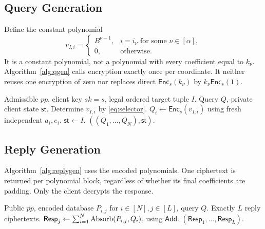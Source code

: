 \subsection{Query Generation}
\label{sec:qgen}
Define the constant polynomial
\begin{equation}
\label{eq:selector}
 v_{I,i}=\begin{cases}B^{\nu-1},&i=i_{\nu}\text{ for some }\nu\in[\alpha],\\
                         0,&\text{otherwise}.\end{cases}
\end{equation}
It is a constant polynomial, not a polynomial with every coefficient equal
to \(k_{\nu}\). Algorithm~\ref{alg:qgen} calls encryption exactly once per
coordinate. It neither reuses one encryption of zero nor replaces direct
\(\mathsf{Enc}_s(k_{\nu})\) by \(k_{\nu}\mathsf{Enc}_s(1)\).
\begin{algorithm}[t]
\caption{Query Generation \(\mathsf{QueryGen}(pp,sk,I)\)}
\label{alg:qgen}
\begin{algorithmic}[1]
\Require Admissible \(pp\), client key \(sk=s\), legal ordered target tuple \(I\).
\Ensure Query \(Q\), private client state \(\mathsf{st}\).
 \State Determine \(v_{I,i}\) by \eqref{eq:selector}.
 \State \(Q_i\leftarrow\mathsf{Enc}_s(v_{I,i})\) using fresh independent \(a_i,e_i\).
\EndFor
\State \(\mathsf{st}\gets I\).
\State \Return \(((Q_1,\ldots,Q_N),\mathsf{st})\).
\end{algorithmic}
\end{algorithm}

\subsection{Reply Generation}
\label{sec:reply}
Algorithm~\ref{alg:replygen} uses the encoded polynomials. One ciphertext is
returned per polynomial block, regardless of whether its final coefficients
are padding. Only the client decrypts the response.
\begin{algorithm}[t]
\caption{Reply Generation \(\mathsf{ReplyGen}(pp,\{P_{i,j}\},Q)\)}
\label{alg:replygen}
\begin{algorithmic}[1]
\Require Public \(pp\), encoded database \(P_{i,j}\) for \(i\in[N],j\in[L]\), query \(Q\).
\Ensure Exactly \(L\) reply ciphertexts.
 \State \(\mathsf{Resp}_j\gets\sum_{i=1}^N\mathrm{Absorb}(P_{i,j},Q_i)\), using \(\mathsf{Add}\).
\EndFor
\State \Return \((\mathsf{Resp}_1,\ldots,\mathsf{Resp}_L)\).
\end{algorithmic}
\end{algorithm}


